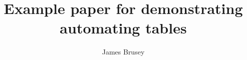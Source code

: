\documentclass{article}
\title{Example paper for demonstrating automating tables}
\author{James Brusey}
\begin{document}
\maketitle

\begin{table}
  
  \caption{Example table generated from script}
\end{table}
\end{document}
